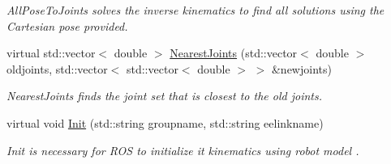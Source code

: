 \begin{DoxyCompactItemize}
\begin{DoxyCompactList}\small\item\em All\-Pose\-To\-Joints solves the inverse kinematics to find all solutions using the Cartesian pose provided. \end{DoxyCompactList}\item 
virtual std\-::vector$<$ double $>$ \hyperlink{classMoveitKinematics_acd060eacf93c71b0cfb61bd5c93ceb77}{Nearest\-Joints} (std\-::vector$<$ double $>$ oldjoints, std\-::vector$<$ std\-::vector$<$ double $>$ $>$ \&newjoints)
\begin{DoxyCompactList}\small\item\em Nearest\-Joints finds the joint set that is closest to the old joints. \end{DoxyCompactList}\item 
virtual void \hyperlink{classMoveitKinematics_a3d0a3d9eadca26b5a24dd9904fee6e91}{Init} (std\-::string groupname, std\-::string eelinkname)
\begin{DoxyCompactList}\small\item\em Init is necessary for R\-O\-S to initialize it kinematics using robot model . \end{DoxyCompactList}\end{DoxyCompactItemize}
